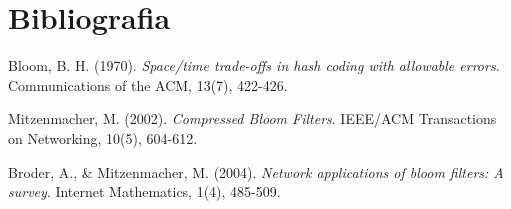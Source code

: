 \documentclass{article}
\begin{document}
\section{Bibliografia}

\begin{thebibliography}{9}

Bloom, B. H. (1970). \textit{Space/time trade-offs in hash coding with allowable errors}. Communications of the ACM, 13(7), 422-426.

Mitzenmacher, M. (2002). \textit{Compressed Bloom Filters}. IEEE/ACM Transactions on Networking, 10(5), 604-612.

Broder, A., \& Mitzenmacher, M. (2004). \textit{Network applications of bloom filters: A survey}. Internet Mathematics, 1(4), 485-509.

\end{thebibliography}
\end{document}
